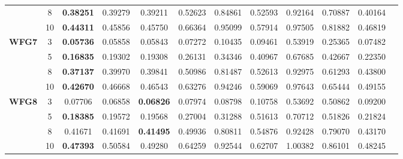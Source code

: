 \documentclass{sig-alternate}
\begin{document}
\begin{table*}[!htb]
\begin{tabular}{|c|c|c|c|c|c|c|c|c|c|c|c|}
		& 8          & \textbf{0.38251} & 0.39279           & 0.39211               & 0.52623          & 0.84861             & 0.52593             & 0.92164            & 0.70887              & 0.40164          \\ \cline{2-11} 
		& 10         & \textbf{0.44311} & 0.45856           & 0.45750               & 0.66364          & 0.95099             & 0.57914             & 0.97505            & 0.81882              & 0.46819          \\ \hline
		\multirow{4}{*}{\textbf{WFG7}}  & 3          & \textbf{0.05736} & 0.05858           & 0.05843               & 0.07272          & 0.10435             & 0.09461             & 0.53919            & 0.25365              & 0.07482          \\ \cline{2-11} 
		& 5          & \textbf{0.16835} & 0.19302           & 0.19308               & 0.26131          & 0.34346             & 0.40967             & 0.67685            & 0.42667              & 0.22350          \\ \cline{2-11} 
		& 8          & \textbf{0.37137} & 0.39970           & 0.39841               & 0.50986          & 0.81487             & 0.52613             & 0.92975            & 0.61293              & 0.43800          \\ \cline{2-11} 
		& 10         & \textbf{0.42670} & 0.46668           & 0.46543               & 0.63276          & 0.94246             & 0.59069             & 0.97643            & 0.65444              & 0.49155          \\ \hline
		\multirow{4}{*}{\textbf{WFG8}}  & 3          & 0.07706          & 0.06858           & \textbf{0.06826}      & 0.07974          & 0.08798             & 0.10758             & 0.53692            & 0.50862              & 0.09200          \\ \cline{2-11} 
		& 5          & \textbf{0.18385} & 0.19572           & 0.19568               & 0.27004          & 0.31288             & 0.51613             & 0.70712            & 0.51826              & 0.21824          \\ \cline{2-11} 
		& 8          & 0.41671          & 0.41691           & \textbf{0.41495}      & 0.49936          & 0.80811             & 0.54876             & 0.92428            & 0.79070              & 0.43170          \\ \cline{2-11} 
		& 10         & \textbf{0.47393} & 0.50584           & 0.49280               & 0.64259          & 0.92544             & 0.62707             & 1.00382            & 0.86101              & 0.48245          \\ \hline

\end{tabular}
\end{table*}
\end{document}
